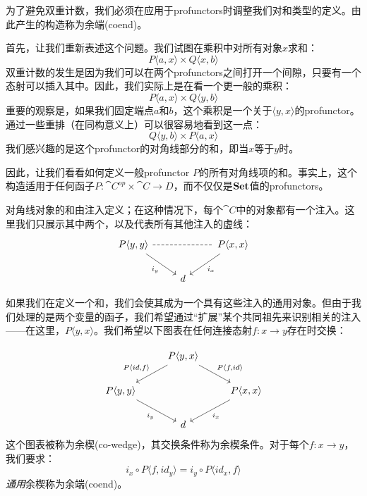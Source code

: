 \documentclass[DaoFP]{subfiles}
\begin{document}
为了避免双重计数，我们必须在应用于profunctors时调整我们对和类型的定义。由此产生的构造称为余端(coend)。

首先，让我们重新表述这个问题。我们试图在乘积中对所有对象$x$求和：
\[ P \langle a, x \rangle \times Q \langle x, b \rangle \]
双重计数的发生是因为我们可以在两个profunctors之间打开一个间隙，只要有一个态射可以插入其中。因此，我们实际上是在看一个更一般的乘积：
\[ P \langle a, x \rangle \times Q \langle y, b \rangle \]
重要的观察是，如果我们固定端点$a$和$b$，这个乘积是一个关于$\langle y, x \rangle$的profunctor。通过一些重排（在同构意义上）可以很容易地看到这一点：
\[ Q \langle y, b \rangle \times P \langle a, x \rangle \]
我们感兴趣的是这个profunctor的对角线部分的和，即当$x$等于$y$时。

因此，让我们看看如何定义一般profunctor $P$的所有对角线项的和。事实上，这个构造适用于任何函子$P \colon \cat C^{op} \times \cat C \to D$，而不仅仅是$\mathbf{Set}$值的profunctors。

对角线对象的和由注入定义；在这种情况下，每个$\cat C$中的对象都有一个注入。这里我们只展示其中两个，以及代表所有其他注入的虚线：
\[
 \begin{tikzcd}
 P \langle y, y \rangle
 \arrow[dr, "i_y"']
 \arrow[rr, dash, dashed]
 &&P \langle x, x \rangle
 \arrow[dl, "i_x"]
 \\
 & d
 \end{tikzcd}
\]

如果我们在定义一个和，我们会使其成为一个具有这些注入的通用对象。但由于我们处理的是两个变量的函子，我们希望通过“扩展”某个共同祖先来识别相关的注入——在这里，$P \langle y, x \rangle$。我们希望以下图表在任何连接态射$f\colon x \to y$存在时交换：

\[
 \begin{tikzcd}
 &P \langle y, x \rangle
 \arrow[ld, "{P \langle id, f \rangle}"']
 \arrow[rd, "{P \langle f, id \rangle}"]
 \\
 P \langle y, y \rangle
 \arrow[dr, "i_y"']
 &&P \langle x, x \rangle
 \arrow[dl, "i_x"]
 \\
 &d
 \end{tikzcd}
\]
这个图表被称为余楔(co-wedge)，其交换条件称为余楔条件。对于每个$f \colon x \to y$，我们要求：
\[ i_x \circ P \langle f, id_y \rangle = i_y \circ P \langle id_x, f \rangle \]
\emph{通用}余楔称为余端(coend)。
\end{document}
